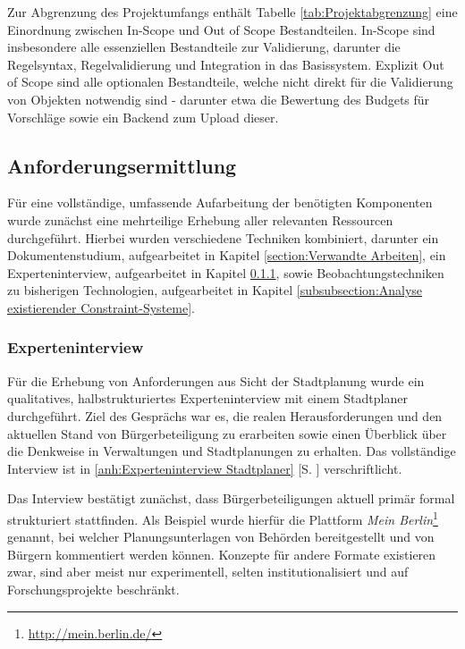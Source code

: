 Zur Abgrenzung des Projektumfangs enthält Tabelle \ref{tab:Projektabgrenzung} eine Einordnung zwischen In-Scope und Out of Scope Bestandteilen. In-Scope sind insbesondere alle essenziellen Bestandteile zur Validierung, darunter die Regelsyntax, Regelvalidierung und Integration in das Basissystem. Explizit Out of Scope sind alle optionalen Bestandteile, welche nicht direkt für die Validierung von Objekten notwendig sind - darunter etwa die Bewertung des Budgets für Vorschläge sowie ein Backend zum Upload dieser.

\subsection{Anforderungsermittlung}\label{subsection:Elicitation}

Für eine vollständige, umfassende Aufarbeitung der benötigten Komponenten wurde zunächst eine mehrteilige Erhebung aller relevanten Ressourcen durchgeführt. Hierbei wurden verschiedene Techniken kombiniert, darunter ein Dokumentenstudium, aufgearbeitet in Kapitel \ref{section:Verwandte Arbeiten}, ein Experteninterview, aufgearbeitet in Kapitel \ref{subsubsection:Experteninterview}, sowie Beobachtungstechniken zu bisherigen Technologien, aufgearbeitet in Kapitel \ref{subsubsection:Analyse existierender Constraint-Systeme}.

\subsubsection{Experteninterview}\label{subsubsection:Experteninterview}

Für die Erhebung von Anforderungen aus Sicht der Stadtplanung wurde ein qualitatives, halbstrukturiertes Experteninterview mit einem Stadtplaner durchgeführt. Ziel des Gesprächs war es, die realen Herausforderungen und den aktuellen Stand von Bürgerbeteiligung zu erarbeiten sowie einen Überblick über die Denkweise in Verwaltungen und Stadtplanungen zu erhalten. Das vollständige Interview ist in \ref{anh:Experteninterview Stadtplaner} [S. \pageref{anh:Experteninterview Stadtplaner}] verschriftlicht.

Das Interview bestätigt zunächst, dass Bürgerbeteiligungen aktuell primär formal strukturiert stattfinden. Als Beispiel wurde hierfür die Plattform \textit{Mein Berlin}\footnote{\url{http://mein.berlin.de/}} genannt, bei welcher Planungsunterlagen von Behörden bereitgestellt und von Bürgern kommentiert werden können. Konzepte für andere Formate existieren zwar, sind aber meist nur experimentell, selten institutionalisiert und auf Forschungsprojekte beschränkt.

